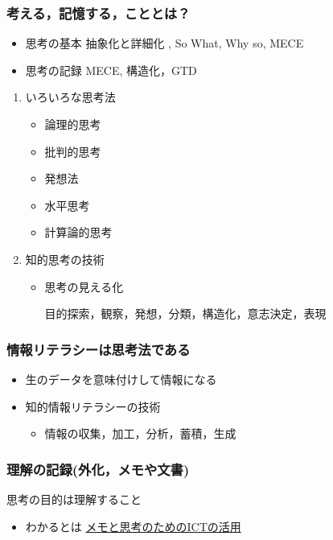 \documentclass[dvipdfmx,11pat]{jarticle}
\begin{document}
\subsubsection{考える，記憶する，こととは？}
\label{sec:org504bb51}

\begin{itemize}
\item 思考の基本 抽象化と詳細化 , So What, Why so, MECE
\item 思考の記録 MECE, 構造化，GTD
\end{itemize}
\begin{enumerate}
\item いろいろな思考法
\label{sec:org4c1b371}
\begin{itemize}
\item 論理的思考
\item 批判的思考
\item 発想法
\item 水平思考
\item 計算論的思考
\end{itemize}
\item 知的思考の技術
\label{sec:orgbae3721}
\begin{itemize}
\item 思考の見える化

目的探索，観察，発想，分類，構造化，意志決定，表現
\end{itemize}
\end{enumerate}
\subsubsection{情報リテラシーは思考法である}
\label{sec:org96105f5}
\begin{itemize}
\item 生のデータを意味付けして情報になる
\item 知的情報リテラシーの技術
\begin{itemize}
\item 情報の収集，加工，分析，蓄積，生成
\end{itemize}
\end{itemize}
\subsubsection{理解の記録(外化，メモや文書)}
\label{sec:org123ec4f}

思考の目的は理解すること
\begin{itemize}
\item わかるとは \href{https://masayuki054.github.io/ict\_literacy\_for\_thinking\_and\_memo/\#outline-container-orgeb1c772}{メモと思考のためのICTの活用}
\end{itemize}
\end{document}
